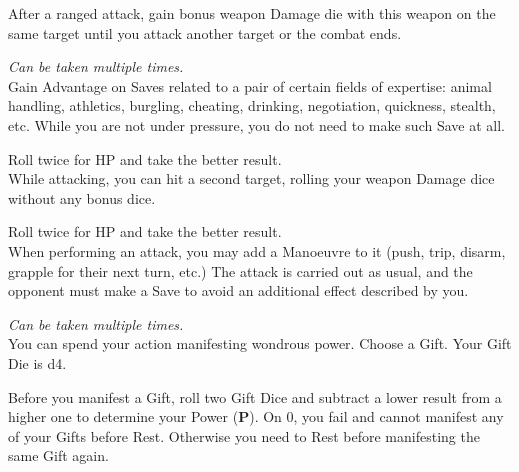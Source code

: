 \documentclass[itdr]{subfiles}
\begin{document}
\vfill
{}
After a ranged attack, gain bonus weapon Damage die with this weapon on the same target until you attack another target or the combat ends.

\vfill
{} {\slshape Can be taken multiple times.}\\
Gain Advantage on Saves related to a pair of certain fields of expertise: animal handling, athletics, burgling, cheating, drinking, negotiation, quickness, stealth, etc. While you are not under pressure, you do not need to make such Save at all.

\break

 Roll twice for HP and take the better result.\\
While attacking, you can hit a second target, rolling your weapon Damage dice without any bonus dice.

\vfill
{}
 Roll twice for HP and take the better result.\\
When performing an attack, you may add a Manoeuvre to it (push, trip, disarm, grapple for their next turn, etc.) The attack is carried out as usual, and the opponent must make a Save to avoid an additional effect described by you.

\vfill
{}
 {\slshape Can be taken multiple times.}\\
You can spend your action manifesting wondrous power. Choose a Gift. Your Gift Die is d4.

Before you manifest a Gift, roll two Gift Dice and subtract a lower result from a higher one to determine your Power (\textbf{P}). On 0, you fail and cannot manifest any of your Gifts before Rest. Otherwise you need to Rest before manifesting the same Gift again.
\end{document}
